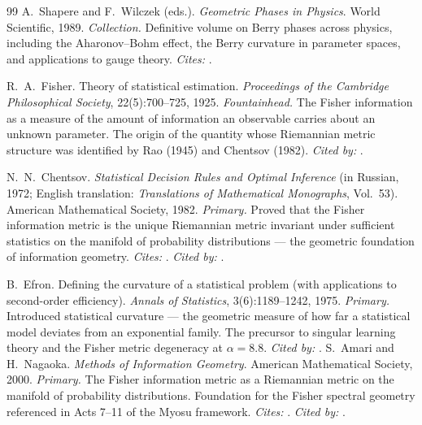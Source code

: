 \documentclass[12pt,a4paper]{article}
\begin{document}
\begin{thebibliography}{99}
A.~Shapere and F.~Wilczek (eds.).
\newblock \emph{Geometric Phases in Physics}.
\newblock World Scientific, 1989.
\newblock \textit{Collection.} Definitive volume on Berry phases across physics, including
the Aharonov--Bohm effect, the Berry curvature in parameter spaces, and applications
to gauge theory. \textit{Cites:} \cite{berry1984,simon1983,aharonov1959}.

R.~A.~Fisher.
\newblock Theory of statistical estimation.
\newblock \emph{Proceedings of the Cambridge Philosophical Society}, 22(5):700--725, 1925.
\newblock \textit{Fountainhead.} The Fisher information as a measure of the amount of
information an observable carries about an unknown parameter. The origin of the
quantity whose Riemannian metric structure was identified by Rao (1945) and
Chentsov (1982). \textit{Cited by:} \cite{rao1945,amari2000}.

N.~N.~Chentsov.
\newblock \emph{Statistical Decision Rules and Optimal Inference} (in Russian, 1972;
English translation: \emph{Translations of Mathematical Monographs}, Vol.~53).
\newblock American Mathematical Society, 1982.
\newblock \textit{Primary.} Proved that the Fisher information metric is the unique
Riemannian metric invariant under sufficient statistics on the manifold of
probability distributions --- the geometric foundation of information geometry.
\textit{Cites:} \cite{rao1945,fisher1925}. \textit{Cited by:} \cite{amari2000}.

B.~Efron.
\newblock Defining the curvature of a statistical problem (with applications to
second-order efficiency).
\newblock \emph{Annals of Statistics}, 3(6):1189--1242, 1975.
\newblock \textit{Primary.} Introduced statistical curvature --- the geometric measure of
how far a statistical model deviates from an exponential family. The precursor
to singular learning theory and the Fisher metric degeneracy at $\alpha=8.8$.
\textit{Cited by:} \cite{amari2000,watanabe2009}.
S.~Amari and H.~Nagaoka.
\newblock \emph{Methods of Information Geometry}.
\newblock American Mathematical Society, 2000.
\newblock \textit{Primary.} The Fisher information metric as a Riemannian metric on the
manifold of probability distributions. Foundation for the Fisher spectral geometry
referenced in Acts 7--11 of the Myosu framework. \textit{Cites:} \cite{rao1945}.
\textit{Cited by:} \cite{watanabe2009,fujikawa2007}.


\end{thebibliography}
\end{document}
